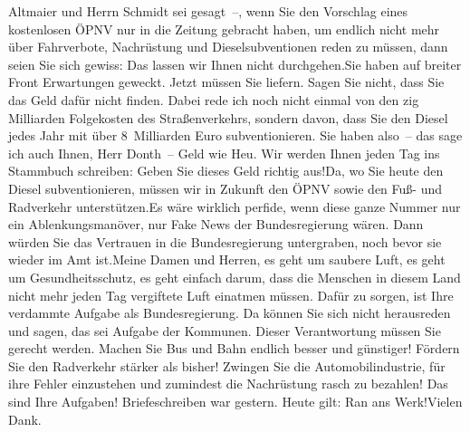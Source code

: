 \documentclass{article}
\begin{document}
Altmaier und Herrn Schmidt sei gesagt –, wenn Sie den Vorschlag eines kostenlosen ÖPNV nur in die Zeitung gebracht haben, um endlich nicht mehr über Fahrverbote, Nachrüstung und Dieselsubventionen reden zu müssen, dann seien Sie sich gewiss: Das lassen wir Ihnen nicht durchgehen.Sie haben auf breiter Front Erwartungen geweckt. Jetzt müssen Sie liefern. Sagen Sie nicht, dass Sie das Geld dafür nicht finden. Dabei rede ich noch nicht einmal von den zig Milliarden Folgekosten des Straßenverkehrs, sondern davon, dass Sie den Diesel jedes Jahr mit über 8 Milliarden Euro subventionieren. Sie haben also – das sage ich auch Ihnen, Herr Donth – Geld wie Heu. Wir werden Ihnen jeden Tag ins Stammbuch schreiben: Geben Sie dieses Geld richtig aus!Da, wo Sie heute den Diesel subventionieren, müssen wir in Zukunft den ÖPNV sowie den Fuß- und Radverkehr unterstützen.Es wäre wirklich perfide, wenn diese ganze Nummer nur ein Ablenkungsmanöver, nur Fake News der Bundesregierung wären. Dann würden Sie das Vertrauen in die Bundesregierung untergraben, noch bevor sie wieder im Amt ist.Meine Damen und Herren, es geht um saubere Luft, es geht um Gesundheitsschutz, es geht einfach darum, dass die Menschen in diesem Land nicht mehr jeden Tag vergiftete Luft einatmen müssen. Dafür zu sorgen, ist Ihre verdammte Aufgabe als Bundesregierung. Da können Sie sich nicht herausreden und sagen, das sei Aufgabe der Kommunen. Dieser Verantwortung müssen Sie gerecht werden. Machen Sie Bus und Bahn endlich besser und günstiger! Fördern Sie den Radverkehr stärker als bisher! Zwingen Sie die Automobilindustrie, für ihre Fehler einzustehen und zumindest die Nachrüstung rasch zu bezahlen! Das sind Ihre Aufgaben! Briefeschreiben war gestern. Heute gilt: Ran ans Werk!Vielen Dank.
\end{document}
